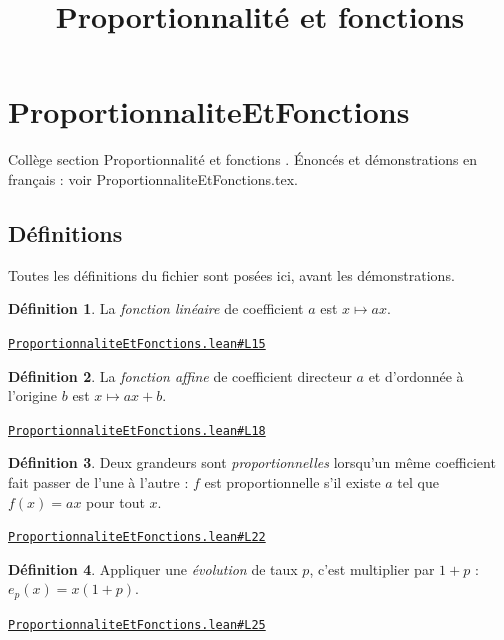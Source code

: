\documentclass[11pt,a4paper]{article}
\title{Proportionnalité et fonctions}
\date{}
\theoremstyle{definition}
\newtheorem{definition}{Définition}
\theoremstyle{plain}
\newcommand{\source}[2]{\par\smallskip\noindent\hfill{\footnotesize\href{#1}{\texttt{#2}}}\par\smallskip}
\begin{document}
\maketitle
\sloppy

\section{ProportionnaliteEtFonctions}

\noindent
Collège \textemdash{} section \og{} Proportionnalité et fonctions \fg{}.
Énoncés et démonstrations en français : voir ProportionnaliteEtFonctions.tex.

\subsection{Définitions}

\noindent
Toutes les définitions du fichier sont posées ici, avant les démonstrations.

\begin{definition}
La \emph{fonction linéaire} de coefficient $a$ est $x \mapsto ax$.
\end{definition}
\source{https://github.com/Commutator-IO/learn-lean/blob/main/cours/01-college/05-proportionnalite-et-fonctions/ProportionnaliteEtFonctions.lean\#L15}{ProportionnaliteEtFonctions.lean\#L15}

\begin{definition}
La \emph{fonction affine} de coefficient directeur $a$ et d'ordonnée à l'origine $b$
est $x \mapsto ax + b$.
\end{definition}
\source{https://github.com/Commutator-IO/learn-lean/blob/main/cours/01-college/05-proportionnalite-et-fonctions/ProportionnaliteEtFonctions.lean\#L18}{ProportionnaliteEtFonctions.lean\#L18}

\begin{definition}
Deux grandeurs sont \emph{proportionnelles} lorsqu'un même coefficient fait passer de
l'une à l'autre : $f$ est proportionnelle s'il existe $a$ tel que $f(x) = ax$ pour tout
$x$.
\end{definition}
\source{https://github.com/Commutator-IO/learn-lean/blob/main/cours/01-college/05-proportionnalite-et-fonctions/ProportionnaliteEtFonctions.lean\#L22}{ProportionnaliteEtFonctions.lean\#L22}

\begin{definition}
Appliquer une \emph{évolution} de taux $p$, c'est multiplier par $1 + p$ :
$e_p(x) = x(1 + p)$.
\end{definition}
\source{https://github.com/Commutator-IO/learn-lean/blob/main/cours/01-college/05-proportionnalite-et-fonctions/ProportionnaliteEtFonctions.lean\#L25}{ProportionnaliteEtFonctions.lean\#L25}
\end{document}
